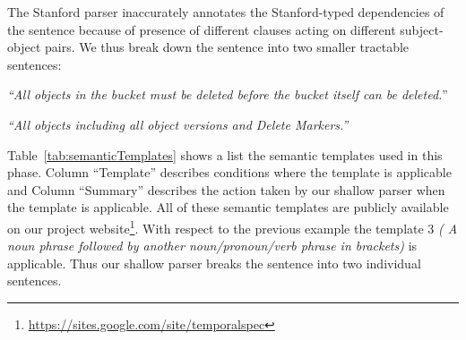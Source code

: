 The Stanford parser inaccurately annotates the Stanford-typed dependencies of the sentence because of presence of different clauses acting on different subject-object pairs.
We thus break down the sentence into two smaller tractable sentences:

\begin{center}
\scriptsize \textit{``All objects in the bucket must be deleted before the bucket itself can be deleted.}''
	
\textit{``All objects including all object versions and Delete Markers.''}\normalsize 
\end{center} 


Table~\ref{tab:semanticTemplates} shows a list the semantic templates used in this phase.
Column ``Template'' describes conditions where the template is applicable and Column ``Summary'' describes the action taken by our shallow parser when the template is applicable.
All of these semantic templates are publicly available on our project website\footnote{\url{https://sites.google.com/site/temporalspec}}.
With respect to the previous example the template 3 \textit{( A noun phrase followed by another noun/pronoun/verb phrase in brackets)} is applicable.
Thus our shallow parser breaks the sentence into two individual sentences.
	 
